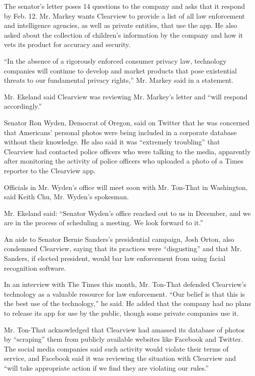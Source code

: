 The senator's letter poses 14 questions to the company and asks that it
respond by Feb. 12. Mr. Markey wants Clearview to provide a list of all
law enforcement and intelligence agencies, as well as private entities,
that use the app. He also asked about the collection of children's
information by the company and how it vets its product for accuracy and
security.

``In the absence of a rigorously enforced consumer privacy law,
technology companies will continue to develop and market products that
pose existential threats to our fundamental privacy rights,'' Mr. Markey
said in a statement.

Mr. Ekeland said Clearview was reviewing Mr. Markey's letter and ``will
respond accordingly.''

Senator Ron Wyden, Democrat of Oregon, said on Twitter that he was
concerned that Americans' personal photos were being included in a
corporate database without their knowledge. He also said it was
``extremely troubling'' that Clearview had contacted police officers who
were talking to the media, apparently after monitoring the activity of
police officers who uploaded a photo of a Times reporter to the
Clearview app.

Officials in Mr. Wyden's office will meet soon with Mr. Ton-That in
Washington, said Keith Chu, Mr. Wyden's spokesman.

Mr. Ekeland said: ``Senator Wyden's office reached out to us in
December, and we are in the process of scheduling a meeting. We look
forward to it.''

An aide to Senator Bernie Sanders's presidential campaign, Josh Orton,
also condemned Clearview, saying that its practices were ``disgusting''
and that Mr. Sanders, if elected president, would bar law enforcement
from using facial recognition software.

In an interview with The Times this month, Mr. Ton-That defended
Clearview's technology as a valuable resource for law enforcement. ``Our
belief is that this is the best use of the technology,'' he said. He
added that the company had no plans to release its app for use by the
public, though some private companies use it.

Mr. Ton-That acknowledged that Clearview had amassed its database of
photos by ``scraping'' them from publicly available websites like
Facebook and Twitter. The social media companies said such activity
would violate their terms of service, and Facebook said it was reviewing
the situation with Clearview and ``will take appropriate action if we
find they are violating our rules.''

